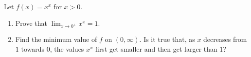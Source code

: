 Let $f(x)=x^x$ for $x>0$.
\begin{enumerate}
\item[(a)] Prove that $\displaystyle\lim_{x\to0^+}x^x=1$.
\item[(b)] Find the minimum value of $f$ on $(0,\infty)$. Is it true that, as $x$ decreases from $1$ towards $0$, the values $x^x$ first get smaller and then get larger than $1$?
\end{enumerate}
